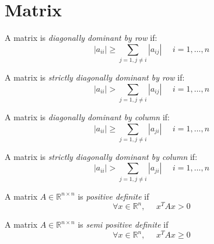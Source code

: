 \section{Matrix}

\begin{definition}
    A matrix is \emph{diagonally dominant by row} if: 
    \[\left\lvert a_{ii} \right\rvert \geq \sum_{j=1,j \neq i}{\left\lvert a_{ij} \right\rvert} \:\:\:\:\:\: i=1,\dots,n\]

    A matrix is \emph{strictly diagonally dominant by row} if: 
    \[\left\lvert a_{ii} \right\rvert > \sum_{j=1,j \neq i}{\left\lvert a_{ij} \right\rvert} \:\:\:\:\:\: i=1,\dots,n\]

    A matrix is \emph{diagonally dominant by column} if: 
    \[\left\lvert a_{ii} \right\rvert \geq \sum_{j=1,j \neq i}{\left\lvert a_{ji} \right\rvert} \:\:\:\:\:\: i=1,\dots,n \]

    A matrix is \emph{strictly diagonally dominant by column} if: 
    \[\left\lvert a_{ii} \right\rvert > \sum_{j=1,j \neq i}{\left\lvert a_{ji} \right\rvert} \:\:\:\:\:\: i=1,\dots,n \]

    A matrix $A \in \mathbb{R}^{n \times n}$ is \emph{positive definite} if 
    \[\forall x \in \mathbb{R}^{n}, \:\:\:\:\:\: x^T  Ax>0\]

    A matrix $A \in \mathbb{R}^{n \times n}$ is \emph{semi positive definite} if 
    \[\forall x \in \mathbb{R}^{n}, \:\:\:\:\:\: x^T  Ax \geq 0\]
\end{definition}